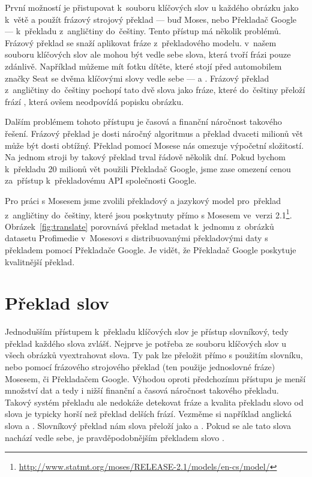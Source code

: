 První možností je přistupovat k~souboru klíčových slov u každého obrázku jako k~větě a použít frázový strojový překlad --- buď Moses, nebo Překladač Google\cite{googletranslate} --- k~překladu z~angličtiny do~češtiny. Tento přístup má několik problémů. Frázový překlad se snaží aplikovat fráze z~překladového modelu. v~našem souboru klíčových slov ale mohou být vedle sebe slova, která tvoří frázi pouze zdánlivě. Například můžeme mít fotku dítěte, které stojí před automobilem značky Seat se dvěma klíčovými slovy vedle sebe ---  a . Frázový překlad z~angličtiny do~češtiny pochopí tato dvě slova jako fráze, které do~češtiny přeloží frází , která ovšem neodpovídá popisku obrázku.

Dalším problémem tohoto přístupu je časová a finanční náročnost takového řešení. Frázový překlad je dosti náročný algoritmus a překlad dvaceti milionů vět může být dosti obtížný. Překlad pomocí Mosese nás omezuje výpočetní složitostí. Na jednom stroji by takový překlad trval řádově několik dní. Pokud bychom k~překladu 20 milionů vět použili Překladač Google, jsme zase omezení cenou za~přístup k~překladovému API společnosti Google.

Pro práci s Mosesem jsme zvolili překladový a jazykový model pro~překlad z~angličtiny do~češtiny, které jsou poskytnuty přímo s Mosesem ve~verzi 2.1\footnote{\url{http://www.statmt.org/moses/RELEASE-2.1/models/en-cs/model/}}. Obrázek~\ref{fig:translate} porovnává překlad metadat k~jednomu z~obrázků datasetu Profimedie v~Mosesovi s distribuovanými překladovými daty s překladem pomocí Překladače Google. Je vidět, že Překladač Google poskytuje kvalitnější překlad. 

\section{Překlad slov}

Jednodušším přístupem k~překladu klíčových slov je přístup slovníkový, tedy překlad každého slova zvlášť. Nejprve je potřeba ze souboru klíčových slov u všech obrázků vyextrahovat slova. Ty pak lze přeložit přímo s použitím slovníku, nebo pomocí frázového strojového překlad (ten použije jednoslovné fráze) Mosesem, či Překladačem Google. Výhodou oproti předchozímu přístupu je menší množství dat a tedy i nižší finanční a časová náročnost takového překladu. Takový systém překladu ale nedokáže detekovat fráze a kvalita překladu slovo od slova je typicky horší než překlad delších frází. Vezměme si například anglická slova  a . Slovníkový překlad nám slova přeloží jako  a . Pokud se ale tato slova nachází vedle sebe, je pravděpodobnějším překladem slovo .


